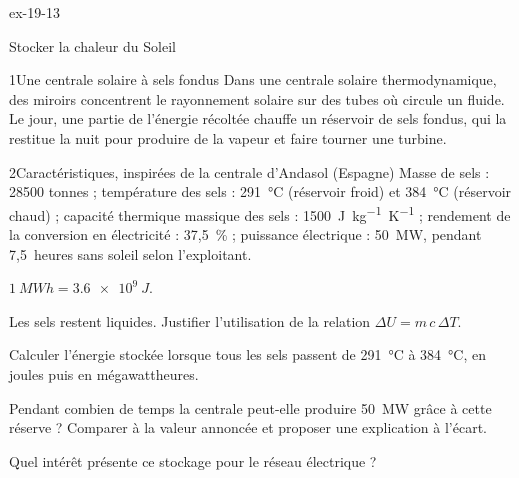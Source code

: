 \begin{blocLivre}{ex-19-13}
\begin{exercice}[3]{Stocker la chaleur du Soleil}
\begin{docu}{1}{Une centrale solaire à sels fondus}
Dans une centrale solaire thermodynamique, des miroirs concentrent le rayonnement solaire sur des tubes où circule un
fluide. Le jour, une partie de l'énergie récoltée chauffe un réservoir de sels fondus, qui la restitue la nuit pour
produire de la vapeur et faire tourner une turbine.
\end{docu}
\begin{docu}{2}{Caractéristiques, inspirées de la centrale d'Andasol (Espagne)}
Masse de sels : \num{28500} tonnes ; température des sels : \qty{291}{\degreeCelsius} (réservoir froid) et \qty{384}{\degreeCelsius}
(réservoir chaud) ; capacité thermique massique des sels : \qty{1500}{J.kg^{-1}.K^{-1}} ; rendement de la conversion en
électricité : 37,5~\% ; puissance électrique : \qty{50}{MW}, pendant 7,5~heures sans soleil selon l'exploitant.
\end{docu}
\begin{donnees}
$\qty{1}{MWh}=\qty{3,6e9}{J}$.
\end{donnees}
\begin{questions}
\item Les sels restent liquides. Justifier l'utilisation de la relation $\Delta U=m\,c\,\Delta T$.
\item Calculer l'énergie stockée lorsque tous les sels passent de \qty{291}{\degreeCelsius} à \qty{384}{\degreeCelsius}, en joules puis en
mégawattheures.
\item \initiative Pendant combien de temps la centrale peut-elle produire \qty{50}{MW} grâce à cette réserve ? Comparer à la
valeur annoncée et proposer une explication à l'écart.
\item Quel intérêt présente ce stockage pour le réseau électrique ?
\end{questions}
\end{exercice}
\end{blocLivre}
